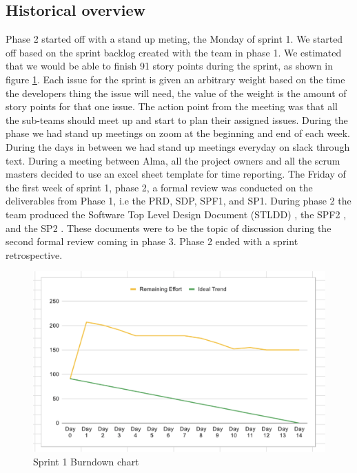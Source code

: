 \documentclass{article}
\begin{document}
\subsection{Historical overview}
Phase 2 started off with a stand up meting, the Monday of sprint 1. We started off based on the sprint backlog created with the team in phase 1. We estimated that we would be able to finish 91 story points during the sprint, as shown in figure \ref{fig:Burndown1}. Each issue for the sprint is given an arbitrary weight based on the time the developers thing the issue will need, the value of the weight is the amount of story points for that one issue. The action point from the meeting was that all the sub-teams should meet up and start to plan their assigned issues. During the phase we had stand up meetings on zoom at the beginning and end of each week. During the days in between we had stand up meetings everyday on slack through text. During a meeting between Alma, all the project owners and all the scrum masters decided to use an excel sheet template for time reporting. The Friday of the first week of  sprint 1, phase 2, a formal review was conducted on the deliverables from Phase 1, i.e the PRD, SDP, SPF1, and SP1. During phase 2 the team produced the Software Top Level Design Document (STLDD) \cite{STLDD}, the SPF2 \cite{SPF2}, and the SP2 \cite{SP2}. These documents were to be the topic of discussion during the second formal review coming in phase 3. Phase 2 ended with a sprint retrospective.

\begin{figure}[h!]
    \centering
    \includegraphics[scale=0.6]{pfrFigures/Sprint1.png}
    \caption{Sprint 1 Burndown chart}
    \label{fig:Burndown1}
\end{figure}
\end{document}
